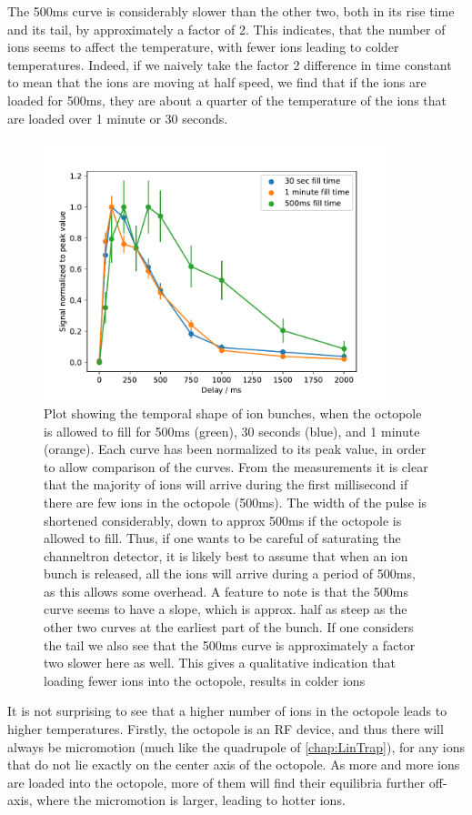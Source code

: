 The 500ms curve is considerably slower than the other two, both in its rise time and its tail, by approximately a factor of 2. This indicates, that the number of ions seems to affect the temperature, with fewer ions leading to colder temperatures.
Indeed, if we naively take the factor 2 difference in time constant to mean that the ions are moving at half speed, we find that if the ions are loaded for 500ms, they are about a quarter 
of the temperature of the ions that are loaded over 1 minute or 30 seconds.
\begin{figure}[h]
    \centering
    \includegraphics[width = 0.9\textwidth]{main/chargeShape.pdf}
    \caption{Plot showing the temporal shape of ion bunches, when the octopole is allowed to fill for 500ms (green), 30 seconds (blue), and 1 minute (orange).
    Each curve has been normalized to its peak value, in order to allow comparison of the curves. From the measurements it is clear that the majority of ions will arrive during the first millisecond if there are few ions in the octopole (500ms).
    The width of the pulse is shortened considerably, down to approx 500ms if the octopole is allowed to fill. Thus, if one wants to be careful of saturating the channeltron detector, it is likely best to assume that when an ion bunch is released, all the ions will arrive during a period of 500ms, as this allows some overhead.
    A feature to note is that the 500ms curve seems to have a slope, which is approx. half as steep as the other two curves at the earliest part of the bunch.
    If one considers the tail we also see that the 500ms curve is approximately a factor two slower here as well. This gives a qualitative indication that loading fewer ions into the octopole, results in colder ions}
    \label{fig:bunchShape}
\end{figure}
\smallskip
It is not surprising to see that a higher number of ions in the octopole leads to higher temperatures. Firstly, the octopole is an RF device, and thus there will always be micromotion
 (much like the quadrupole of \cref{chap:LinTrap}), for any ions that do not lie exactly on the center axis of the octopole. 
As more and more ions are loaded into the octopole, more of them will find their equilibria further off-axis, where the micromotion is larger, leading to hotter ions.


